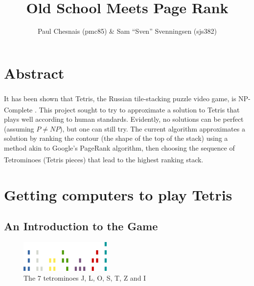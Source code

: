 \documentclass[fontsize=12pt]{article}
\title{Old School \tetris{} Meets Page Rank}
\author{Paul Chesnais (pmc85) \& Sam ``Sven'' Svenningsen (sjs382)}
\date{}
\def\tetris{Tetris\textsuperscript{\textregistered}}
\begin{document}
\maketitle
\thispagestyle{empty}
\section{Abstract}
\label{sec:abstract}

\par It has been shown that \tetris{}, the Russian tile-stacking puzzle video game, is NP-Complete \cite{bib:tetrishard}. This project sought to try to approximate a solution to \tetris{} that plays well according to human standards. Evidently, no solutions can be perfect (assuming $P \neq NP$), but one can still try. The current algorithm approximates a solution by ranking the contour (the shape of the top of the stack) using a method akin to Google's PageRank algorithm, then choosing the sequence of Tetrominoes (\tetris{} pieces) that lead to the highest ranking stack.

\section{Getting computers to play \tetris{}}
\label{sec:getting_computers_to_play_tetris}

\subsection{An Introduction to the Game}
\label{sub:an_introduction_to_the_game}

\begin{figure}[h!]
  \centering
  \includegraphics[width=0.4\textwidth, height=0.1\textwidth]{figures/pieces}
  \caption{The 7 tetrominoes J, L, O, S, T, Z and I }
  \label{fig:the_7_tetrominoes}
\end{figure}
\end{document}

